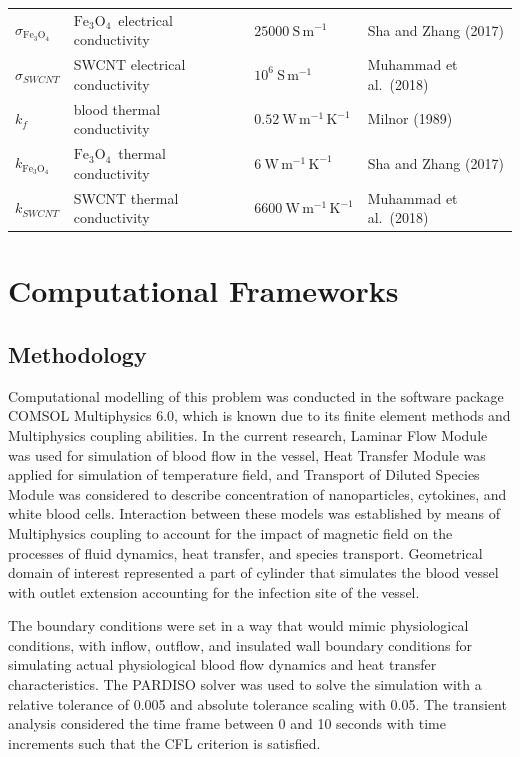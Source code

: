 \documentclass[10pt]{NSP1}
\def\feo{\ensuremath{\mathrm{Fe}_3\mathrm{O}_4}}
\begin{document}
\begin{table}[!t]
\begin{tabular}{p{2.8cm}p{5.8cm}p{3.8cm}p{4.2cm}}
			$\sigma_{\feo}$ & \feo\ electrical conductivity & $25000\ \mathrm{S\,m^{-1}}$ & Sha and Zhang (2017)\\
			$\sigma_{SWCNT}$ & SWCNT electrical conductivity & $10^6\ \mathrm{S\,m^{-1}}$ & Muhammad et al.\ (2018)\\
			$k_f$ & blood thermal conductivity & $0.52\ \mathrm{W\,m^{-1}\,K^{-1}}$ & Milnor (1989)\\
			$k_{\feo}$ & \feo\ thermal conductivity & $6\ \mathrm{W\,m^{-1}\,K^{-1}}$ & Sha and Zhang (2017)\\
			$k_{SWCNT}$ & SWCNT thermal conductivity & $6600\ \mathrm{W\,m^{-1}\,K^{-1}}$ & Muhammad et al.\ (2018)\\
			\hline
		\end{tabular}
	\end{table}
	
	\section{Computational Frameworks}
	
	\subsection{Methodology}
	
	Computational modelling of this problem was conducted in the software package COMSOL Multiphysics 6.0, which is known due to its finite element methods and Multiphysics coupling abilities. In the current research, Laminar Flow Module was used for simulation of blood flow in the vessel, Heat Transfer Module was applied for simulation of temperature field, and Transport of Diluted Species Module was considered to describe concentration of nanoparticles, cytokines, and white blood cells. Interaction between these models was established by means of Multiphysics coupling to account for the impact of magnetic field on the processes of fluid dynamics, heat transfer, and species transport. Geometrical domain of interest represented a part of cylinder that simulates the blood vessel with outlet extension accounting for the infection site of the vessel.
	
	The boundary conditions were set in a way that would mimic physiological conditions, with inflow, outflow, and insulated wall boundary conditions for simulating actual physiological blood flow dynamics and heat transfer characteristics. The PARDISO solver was used to solve the simulation with a relative tolerance of 0.005 and absolute tolerance scaling with 0.05. The transient analysis considered the time frame between 0 and 10 seconds with time increments such that the CFL criterion is satisfied.
	
\end{document}
